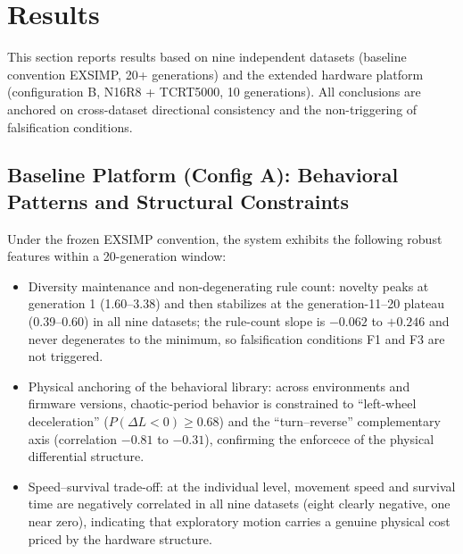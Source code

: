 \documentclass[11pt]{article}
\begin{document}
\section{Results}
\label{sec:results}

This section reports results based on nine independent datasets (baseline convention EXSIMP, 20+ generations) and the extended hardware platform (configuration B, N16R8 + TCRT5000, 10 generations). All conclusions are anchored on cross-dataset directional consistency and the non-triggering of falsification conditions.

\subsection{Baseline Platform (Config A): Behavioral Patterns and Structural Constraints}
Under the frozen EXSIMP convention, the system exhibits the following robust features within a 20-generation window:
\begin{itemize}
  \item Diversity maintenance and non-degenerating rule count: novelty peaks at generation 1 (1.60--3.38) and then stabilizes at the generation-11--20 plateau (0.39--0.60) in all nine datasets; the rule-count slope is $-0.062$ to $+0.246$ and never degenerates to the minimum, so falsification conditions F1 and F3 are not triggered.
  \item Physical anchoring of the behavioral library: across environments and firmware versions, chaotic-period behavior is constrained to ``left-wheel deceleration'' ($P(\Delta L<0) \ge 0.68$) and the ``turn--reverse'' complementary axis (correlation $-0.81$ to $-0.31$), confirming the enforcece of the physical differential structure.
  \item Speed--survival trade-off: at the individual level, movement speed and survival time are negatively correlated in all nine datasets (eight clearly negative, one near zero), indicating that exploratory motion carries a genuine physical cost priced by the hardware structure.
\end{itemize}
\end{document}
